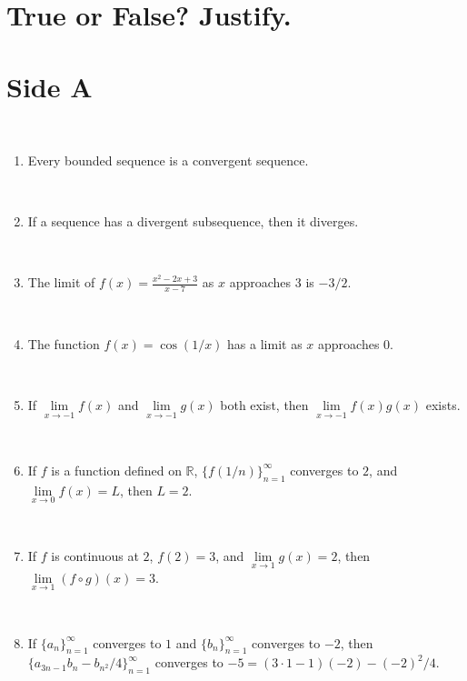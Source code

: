 \documentclass[12pt]{amsart}
\newcommand{\R}{{\mathbb{R}}}
\numberwithin{equation}{section}
\theoremstyle{plain} %
\theoremstyle{definition}
\theoremstyle{remark}
\begin{document}
\thispagestyle{empty}

\section*{\large True or False? Justify.}

\medskip

\section*{Side A}


\



\begin{enumerate}

\item  Every bounded sequence is a convergent sequence.
	
	\
	
\item  If a sequence has a divergent subsequence, then it diverges.
	
	\

\item  The limit of $\displaystyle f(x)=\frac{x^2 - 2x + 3}{x-7}$ as $x$ approaches $3$ is $-3/2$.
	
	\

	\item  The function $f(x)=\cos(1/x)$ has a limit as $x$ approaches $0$.
	
	\
		
	\item  If $\lim\limits_{x\to -1} f(x)$ and $\lim\limits_{x\to -1} g(x)$ both exist, then $\lim\limits_{x\to -1} f(x)g(x)$ exists.
	
	\
	

	
\item  If $f$ is a function defined on $\R$, $\{ f(1/n) \}_{n=1}^\infty$ converges to $2$, and
 ${\lim\limits_{x\to 0} f(x)=L}$, then $L=2$.

\



\item  If $f$ is continuous at $2$, $f(2)=3$, and ${\lim\limits_{x\to 1} g(x)=2}$, then ${\lim\limits_{x\to 1}  (f\circ g)(x) = 3}$.
 
 
	 
	
	 \
	 
	 	\item  If $\{a_n\}_{n=1}^\infty$ converges to $1$ and $\{b_n\}_{n=1}^\infty$ converges to $-2$, then ${\{a_{3n-1} b_{n} - b_{n^2}/4\}_{n=1}^{\infty}}$ converges to $-5 = (3\cdot 1 - 1)(-2) - (-2)^2/4$. 
		

\end{enumerate}
\end{document}
